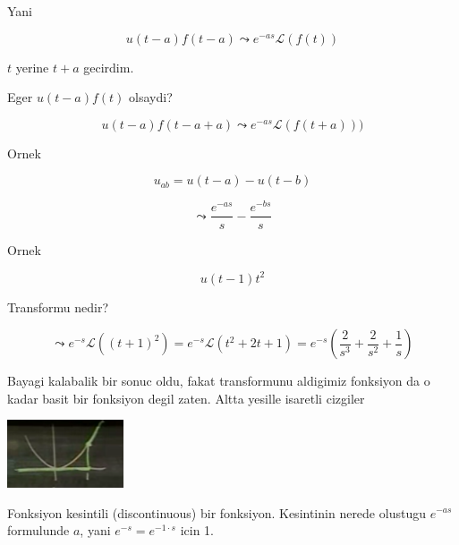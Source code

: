 \documentclass[12pt,fleqn]{article}
\begin{document}
Yani

\[ u(t-a)f(t-a) \leadsto e^{-as}\mathcal{L}(f(t)) \]

$t$ yerine $t+a$ gecirdim.

Eger $u(t-a)f(t)$ olsaydi?

\[ u(t-a)f(t-a+a) \leadsto e^{-as}\mathcal{L}(f(t+a))) \]

Ornek 

\[ u_{ab} = u(t-a) - u(t-b) \]

\[ \leadsto \frac{e^{-as}}{s} - \frac{e^{-bs}}{s} \]

Ornek

\[ u(t-1)t^2 \]

Transformu nedir? 

\[ \leadsto e^{-s}\mathcal{L}((t+1)^2) = 
e^{-s}\mathcal{L} (t^2+2t+1) =
e^{-s}(\frac{2}{s^3} + \frac{2}{s^2} + \frac{1}{s})
 \]

Bayagi kalabalik bir sonuc oldu, fakat transformunu aldigimiz fonksiyon da
o kadar basit bir fonksiyon degil zaten. Altta yesille isaretli cizgiler 

\includegraphics[height=2cm]{22_9.png}

Fonksiyon kesintili (discontinuous) bir fonksiyon. Kesintinin nerede
olustugu $e^{-as}$ formulunde $a$, yani $e^{-s} = e^{-1\cdot s}$ icin 1. 
\end{document}
